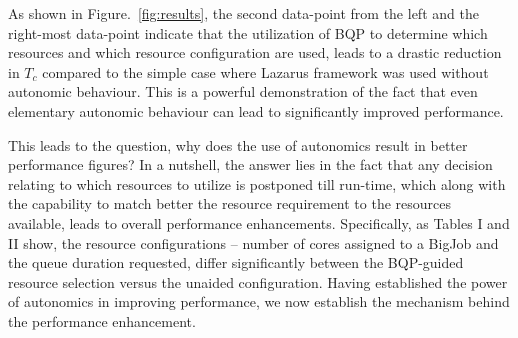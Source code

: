 \documentclass{sig-alternate}
\newcommand{\tc}{$T_c$ }
\newcommand{\up}{\vspace*{-0.3em}}
\begin{document}
As shown in Figure.~\ref{fig:results}, the second data-point from the left and the right-most data-point indicate that the utilization of BQP to determine which resources and which resource configuration are used, leads to a drastic reduction in \tc compared to the simple case where Lazarus framework was used without autonomic behaviour. This is a powerful demonstration of the fact that even elementary autonomic behaviour can lead to significantly improved performance.

\begin{table}
\caption{A table showing the configurations chosen
  on Ranger, with and without BQP. Notice how the use
  of BQP has small but significant changes in the queue, size and duration
  of the BigJob. }\up\up\up\up\up\up\up
\end{table}

This leads to the question, why does the use of autonomics result in
better performance figures? In a nutshell, the answer lies in the fact
that any decision relating to which resources to utilize is postponed
till run-time, which along with the capability to match better the
resource requirement to the resources available, leads to overall
performance enhancements. Specifically, as Tables I and II show, the
resource configurations -- number of cores assigned to a BigJob and
the queue duration requested, differ significantly between the
BQP-guided resource selection versus the unaided configuration.
Having established the power of autonomics in improving performance,
we now establish the mechanism behind the performance enhancement.
\end{document}
